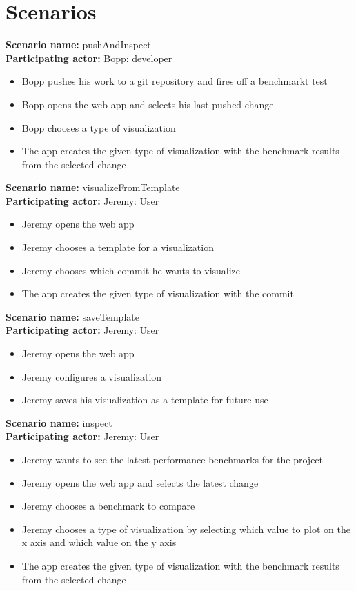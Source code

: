 \documentclass[parskip=full,11pt]{scrartcl}
\begin{document}
\pagebreak
\section{Scenarios}

\textbf{Scenario name:} pushAndInspect \\
\textbf{Participating actor:} Bopp: \gls{developer}
\begin{itemize}
	\item Bopp pushes his work to a git repository and fires off a benchmarkt test
	\item Bopp opens the web app and selects his last pushed change
	\item Bopp chooses a type of visualization
	\item The app creates the given type of visualization with the benchmark results from the selected change
\end{itemize}

\textbf{Scenario name:} visualizeFromTemplate \\
\textbf{Participating actor:} Jeremy: User
\begin{itemize}
	\item Jeremy opens the web app
	\item Jeremy chooses a template for a visualization
	\item Jeremy chooses which commit he wants to visualize
	\item The app creates the given type of visualization with the commit
\end{itemize}

\textbf{Scenario name:} saveTemplate \\
\textbf{Participating actor:} Jeremy: User
\begin{itemize}
	\item Jeremy opens the web app
	\item Jeremy configures a visualization
	\item Jeremy saves his visualization as a template for future use
\end{itemize}

\textbf{Scenario name:} inspect \\
\textbf{Participating actor:} Jeremy: User
\begin{itemize}
	\item Jeremy wants to see the latest performance benchmarks for the project
	\item Jeremy opens the web app and selects the latest change
	\item Jeremy chooses a benchmark to compare
	\item Jeremy chooses a type of visualization by selecting which value to plot on the x axis and which value on the y axis
	\item The app creates the given type of visualization with the benchmark results from the selected change
\end{itemize}
\end{document}
